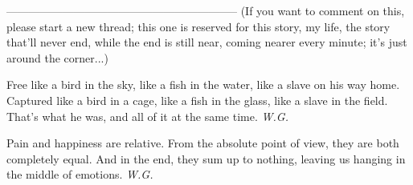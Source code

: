 --------------------------------------------------------------
(If you want to comment on this, please start a new thread; this one is reserved for this story, my life, the story that'll never end, while the end is still near, coming nearer every minute; it's just around the corner...)

Free 
like a bird in the sky, 
like a fish in the water, 
like a slave 
on his way home. 
Captured 
like a bird in a cage, 
like a fish in the glass, 
like a slave in the field. 
That's what he was, 
and all of it 
at the same time. 
\emph{W.G.}

Pain and happiness
are relative. 
From the absolute point of view, 
they are both completely 
equal. 
And in the end, they sum up to nothing, 
leaving us hanging in the middle 
of emotions. 
\emph{W.G.}
